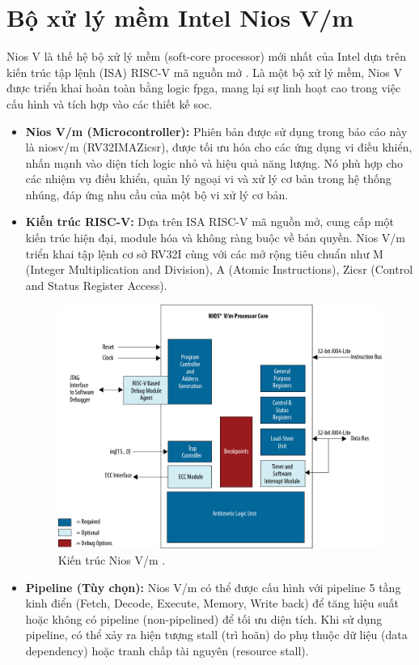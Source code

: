 \section{Bộ xử lý mềm Intel Nios V/m}
Nios V là thế hệ bộ xử lý mềm (soft-core processor) mới nhất của Intel dựa trên kiến trúc tập lệnh (ISA) RISC-V mã nguồn mở \cite{intelNiosVHandbook}. Là một bộ xử lý mềm, Nios V được triển khai hoàn toàn bằng logic \acrshort{fpga}, mang lại sự linh hoạt cao trong việc cấu hình và tích hợp vào các thiết kế \acrshort{soc}.
\begin{itemize}
    \item \textbf{Nios V/m (Microcontroller):} Phiên bản được sử dụng trong báo cáo này là \acrshort{niosv}/m (RV32IMAZicsr), được tối ưu hóa cho các ứng dụng vi điều khiển, nhấn mạnh vào diện tích logic nhỏ và hiệu quả năng lượng. Nó phù hợp cho các nhiệm vụ điều khiển, quản lý ngoại vi và xử lý cơ bản trong hệ thống nhúng, đáp ứng nhu cầu của một bộ vi xử lý cơ bản.
    \item \textbf{Kiến trúc RISC-V:} Dựa trên ISA RISC-V mã nguồn mở, cung cấp một kiến trúc hiện đại, module hóa và không ràng buộc về bản quyền. Nios V/m triển khai tập lệnh cơ sở RV32I cùng với các mở rộng tiêu chuẩn như M (Integer Multiplication and Division), A (Atomic Instructions), Zicsr (Control and Status Register Access).
    \begin{figure}[htbp]
        \centering
        \includegraphics[width=0.6\linewidth]{Images/02_00_NiosVm_Architecture.pdf}
        \caption{Kiến trúc Nios V/m \cite{niosv_architecture}.}
        \label{fig:niosv_architecture}
    \end{figure}
    \item \textbf{Pipeline (Tùy chọn):} Nios V/m có thể được cấu hình với pipeline 5 tầng kinh điển (Fetch, Decode, Execute, Memory, Write back) để tăng hiệu suất hoặc không có pipeline (non-pipelined) để tối ưu diện tích. Khi sử dụng pipeline, có thể xảy ra hiện tượng stall (trì hoãn) do phụ thuộc dữ liệu (data dependency) hoặc tranh chấp tài nguyên (resource stall).
\end{itemize}


